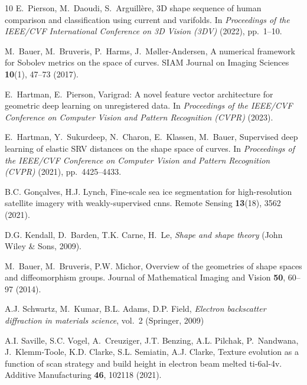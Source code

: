 \documentclass[pdflatex,iicol]{sn-jnl}%
\theoremstyle{thmstyleone}%
\theoremstyle{thmstyletwo}%
\theoremstyle{thmstylethree}%
\begin{document}
\begin{thebibliography}{10}
E.~Pierson, M.~Daoudi, S.~Arguill{\`e}re, 3{D} shape sequence of human comparison and classification using current and varifolds.
\newblock In \emph{Proceedings of the IEEE/CVF International Conference on 3D Vision (3DV)} (2022), pp.~1--10.

M.~Bauer, M.~Bruveris, P.~Harms, J.~M{\o}ller-Andersen, A numerical framework for {S}obolev metrics on the space of curves.
\newblock SIAM Journal on Imaging Sciences \textbf{10}(1), 47--73 (2017).
\newblock {}

E.~Hartman, E.~Pierson, Varigrad: A novel feature vector architecture for geometric deep learning on unregistered data.
\newblock In \emph{Proceedings of the IEEE/CVF Conference on Computer Vision and Pattern Recognition (CVPR)} (2023).

E.~Hartman, Y.~Sukurdeep, N.~Charon, E.~Klassen, M.~Bauer, Supervised deep learning of elastic {SRV} distances on the shape space of curves.
\newblock In \emph{Proceedings of the IEEE/CVF Conference on Computer Vision and Pattern Recognition (CVPR)} (2021), pp.~4425--4433.

B.C. Gon{\c{c}}alves, H.J. Lynch, Fine-scale sea ice segmentation for high-resolution satellite imagery with weakly-supervised cnns.
\newblock Remote Sensing \textbf{13}(18), 3562 (2021).
\newblock {}

D.G. Kendall, D.~Barden, T.K. Carne, H.~Le, \emph{Shape and shape theory} (John Wiley \& Sons, 2009).
\newblock {}

M.~Bauer, M.~Bruveris, P.W. Michor, Overview of the geometries of shape spaces and diffeomorphism groups.
\newblock Journal of Mathematical Imaging and Vision \textbf{50}, 60--97 (2014).
\newblock {}

A.J. Schwartz, M.~Kumar, B.L. Adams, D.P. Field, \emph{Electron backscatter diffraction in materials science}, vol.~2 (Springer, 2009)

A.I. Saville, S.C. Vogel, A.~Creuziger, J.T. Benzing, A.L. Pilchak, P.~Nandwana, J.~Klemm-Toole, K.D. Clarke, S.L. Semiatin, A.J. Clarke, Texture evolution as a function of scan strategy and build height in electron beam melted ti-6al-4v.
\newblock Additive Manufacturing \textbf{46}, 102118 (2021).
\newblock {}


\end{thebibliography}
\end{document}
